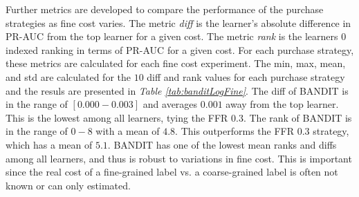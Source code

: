 \documentclass[ms]{nuthesis}
\begin{document}
Further metrics are developed to compare the performance of the purchase strategies
as fine cost varies. The metric \textit{diff} is the learner's absolute difference
 in PR-AUC from the top learner for a given cost. The metric \textit{rank} is the learners
 $0$ indexed ranking in terms of PR-AUC for a given cost. For each purchase strategy,
 these metrics are calculated for each fine cost experiment. The min, max,
 mean, and std are calculated for the $10$ diff and rank values for each purchase strategy
 and the resuls are presented in \textit{Table \ref{tab:banditLogFine}}. The diff of BANDIT
 is in the range of $[0.000-0.003]$ and averages $0.001$ away from the top learner. This is the
 lowest among all learners, tying the FFR $0.3$. The rank of BANDIT is in the range of $0-8$ with
 a mean of $4.8$. This outperforms the FFR $0.3$ strategy, which has a mean of $5.1$. BANDIT has
 one of the lowest mean ranks and diffs among all learners, and thus is robust to variations in fine
 cost. This is important since the real cost of a fine-grained label vs. a coarse-grained label is
 often not known or can only estimated.

\begin{table}[H]
\caption{Aggregated PR AUC for the protein dataset}
\centering
{}
\label{tab:banditLogFine}
\end{table}
\end{document}
